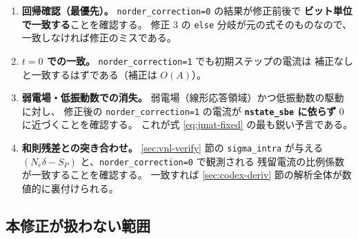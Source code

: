 \documentclass[dvipdfmx,a4paper,11pt]{jsarticle}
\newcommand{\file}[1]{\texttt{#1}}
\begin{document}
\begin{enumerate}
\item \textbf{回帰確認（最優先）。}
      \file{norder\_correction=0} の結果が修正前後で
      \textbf{ビット単位で一致する}ことを確認する。
      修正 3 の \verb|else| 分岐が元の式そのものなので、
      一致しなければ修正のミスである。

\item \textbf{$t=0$ での一致。}
      \file{norder\_correction=1} でも初期ステップの電流は
      補正なしと一致するはずである（補正は $O(A)$）。

\item \textbf{弱電場・低振動数での消失。}
      弱電場（線形応答領域）かつ低振動数の駆動に対し、
      修正後の \file{norder\_correction=1} の電流が
      \textbf{\file{nstate\_sbe} に依らず} $0$ に近づくことを確認する。
      これが式 \eqref{eq:jmat-fixed} の最も鋭い予言である。

\item \textbf{和則残差との突き合わせ。}
      \ref{sec:vnl-verify} 節の \verb|sigma_intra| が与える
      $(N_e\delta - S_P)$ と、\file{norder\_correction=0} で観測される
      残留電流の比例係数が一致することを確認する。
      一致すれば \ref{sec:codex-deriv} 節の解析全体が数値的に裏付けられる。
\end{enumerate}

\subsection{本修正が扱わない範囲}
\end{document}

